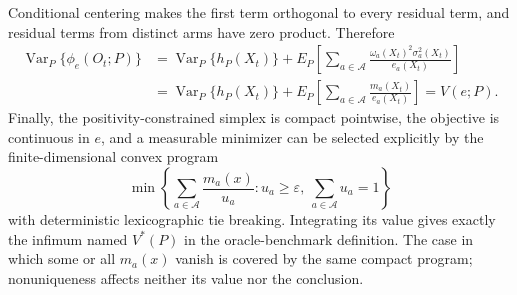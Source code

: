 Conditional centering makes the first term orthogonal to every residual term, and residual terms from distinct arms have zero product.  Therefore
\[
\begin{aligned}
\operatorname{Var}_P\{\phi_e(O_t;P)\}
&=\operatorname{Var}_P\{h_P(X_t)\}
 +E_P\!\left[
  \sum_{a\in\mathcal A}
  \frac{\omega_a(X_t)^2\sigma_a^2(X_t)}{e_a(X_t)}
 \right]\\
&=\operatorname{Var}_P\{h_P(X_t)\}
 +E_P\!\left[\sum_{a\in\mathcal A}\frac{m_a(X_t)}{e_a(X_t)}\right]
=V(e;P).
\end{aligned}
\]
Finally, the positivity-constrained simplex is compact pointwise, the objective is continuous in \(e\), and a measurable minimizer can be selected explicitly by the finite-dimensional convex program
\[
\min\left\{\sum_{a\in\mathcal A}\frac{m_a(x)}{u_a}:
u_a\geq\varepsilon,\ \sum_{a\in\mathcal A}u_a=1\right\}
\]
with deterministic lexicographic tie breaking.  Integrating its value gives exactly the infimum named \(V^*(P)\) in the oracle-benchmark definition.  The case in which some or all \(m_a(x)\) vanish is covered by the same compact program; nonuniqueness affects neither its value nor the conclusion.